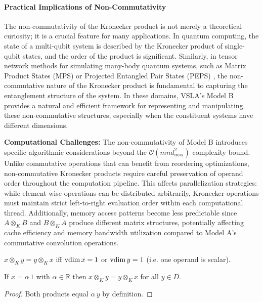 \paragraph{Practical Implications of Non-Commutativity}
The non-commutativity of the Kronecker product is not merely a theoretical curiosity; it is a crucial feature for many applications. In quantum computing, the state of a multi-qubit system is described by the Kronecker product of single-qubit states, and the order of the product is significant. Similarly, in tensor network methods for simulating many-body quantum systems, such as Matrix Product States (MPS) or Projected Entangled Pair States (PEPS) \cite{Orus2019}, the non-commutative nature of the Kronecker product is fundamental to capturing the entanglement structure of the system. In these domains, VSLA's Model B provides a natural and efficient framework for representing and manipulating these non-commutative structures, especially when the constituent systems have different dimensions.

\textbf{Computational Challenges:} The non-commutativity of Model B introduces specific algorithmic considerations beyond the $\mathcal{O}(mnd_{\max}^2)$ complexity bound. Unlike commutative operations that can benefit from reordering optimizations, non-commutative Kronecker products require careful preservation of operand order throughout the computation pipeline. This affects parallelization strategies: while element-wise operations can be distributed arbitrarily, Kronecker operations must maintain strict left-to-right evaluation order within each computational thread. Additionally, memory access patterns become less predictable since $A \otimes_K B$ and $B \otimes_K A$ produce different matrix structures, potentially affecting cache efficiency and memory bandwidth utilization compared to Model A's commutative convolution operations.

\begin{proposition}\label{prop:commCase}
$x\otimes_K y = y\otimes_K x$ iff $\operatorname{vdim} x =1$ or $\operatorname{vdim} y =1$ (i.e. one operand is scalar).
\end{proposition}

\begin{lemma}\label{lem:scalarComm}
If $x=\alpha\,1$ with $\alpha\in\mathbb R$ then $x\otimes_K y = y\otimes_K x$ for all $y\in D$.
\end{lemma}
\begin{proof}
Both products equal $\alpha\,y$ by definition.\end{proof}

